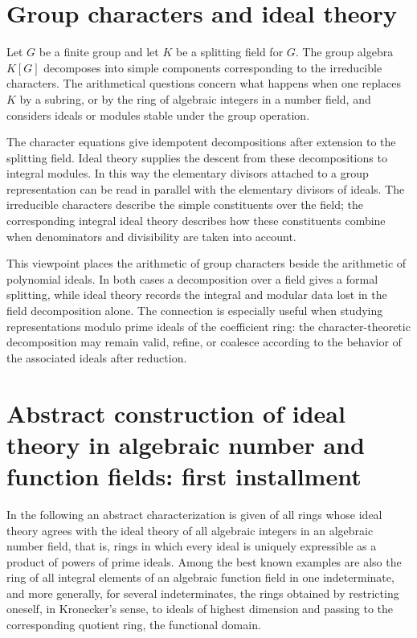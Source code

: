 \documentclass[11pt]{article}
\begin{document}
\section{Group characters and ideal theory}

Let $G$ be a finite group and let $K$ be a splitting field for $G$. The group algebra $K[G]$ decomposes into simple components corresponding to the irreducible characters. The arithmetical questions concern what happens when one replaces $K$ by a subring, or by the ring of algebraic integers in a number field, and considers ideals or modules stable under the group operation.

The character equations give idempotent decompositions after extension to the splitting field. Ideal theory supplies the descent from these decompositions to integral modules. In this way the elementary divisors attached to a group representation can be read in parallel with the elementary divisors of ideals. The irreducible characters describe the simple constituents over the field; the corresponding integral ideal theory describes how these constituents combine when denominators and divisibility are taken into account.

This viewpoint places the arithmetic of group characters beside the arithmetic of polynomial ideals. In both cases a decomposition over a field gives a formal splitting, while ideal theory records the integral and modular data lost in the field decomposition alone. The connection is especially useful when studying representations modulo prime ideals of the coefficient ring: the character-theoretic decomposition may remain valid, refine, or coalesce according to the behavior of the associated ideals after reduction.

\newpage

\section{Abstract construction of ideal theory in algebraic number and function fields: first installment}

In the following an abstract characterization is given of all rings whose ideal theory agrees with the ideal theory of all algebraic integers in an algebraic number field, that is, rings in which every ideal is uniquely expressible as a product of powers of prime ideals. Among the best known examples are also the ring of all integral elements of an algebraic function field in one indeterminate, and more generally, for several indeterminates, the rings obtained by restricting oneself, in Kronecker's sense, to ideals of highest dimension and passing to the corresponding quotient ring, the functional domain.
\end{document}
